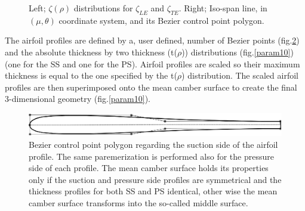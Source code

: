 \begin{figure}[h!]
\begin{minipage}[b]{1\linewidth}
 \centering
\end{minipage}
\caption{Left; $\zeta(\rho)$ distributions for $\zeta_{LE}$ and $\zeta_{TE}$. Right; Iso-span line, in $(\mu,\theta)$ coordinate system, and its Bezier control point polygon.}
\label{param7}
\end{figure}

The airfoil profiles are defined by a, user defined, number of Bezier points (fig.\ref{param8}) and the absolute thickness by two thickness (t($\rho$)) distributions (fig.\ref{param10}) (one for the SS and one for the PS). Airfoil profiles are scaled so their maximum thickness is equal to the one specified by the t($\rho$) distribution. The scaled airfoil profiles are then superimposed onto the mean camber surface to create the final 3-dimensional geometry (fig.\ref{param10}).  

\begin{figure}[h!]
\centering
\includegraphics[width=150mm]{param8.eps} 
\caption{Bezier control point polygon regarding the suction side of the airfoil profile. The same paremerization is performed also for the pressure side of each profile. The mean camber surface holds its properties only if the suction and pressure side profiles are symmetrical and the thickness profiles for both SS and PS identical, other wise the mean camber surface transforms into the so-called middle surface.}
\label{param8}
\end{figure}


